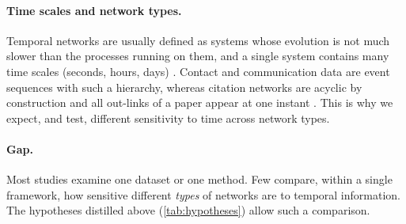\paragraph{Time scales and network types.}
Temporal networks are usually defined as systems whose evolution is not much slower
than the processes running on them, and a single system contains many time scales
(seconds, hours, days) \citep{holme2015modern}. Contact and communication data are
event sequences with such a hierarchy, whereas citation networks are acyclic by
construction and all out-links of a paper appear at one instant
\citep{holme2015modern}. This is why we expect, and test, different sensitivity to time
across network types.

\paragraph{Gap.}
Most studies examine one dataset or one method. Few compare, within a single
framework, how sensitive different \emph{types} of networks are to temporal
information. The hypotheses distilled above (\cref{tab:hypotheses}) allow such a
comparison.
